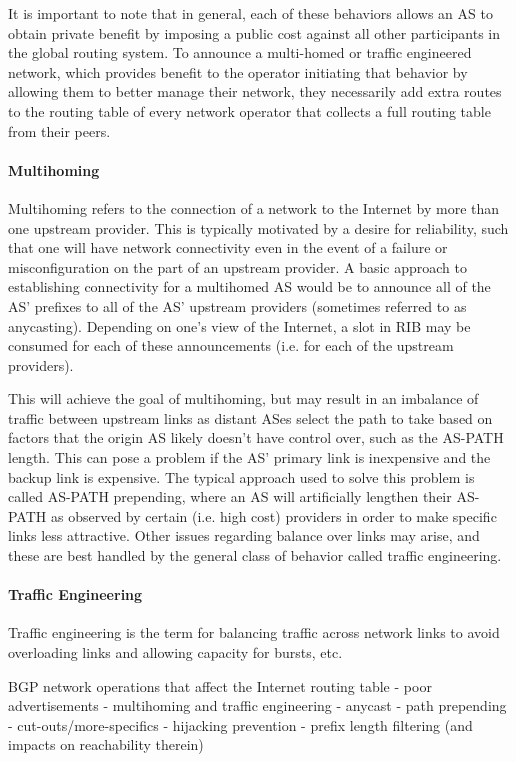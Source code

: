 It is important to note that in general, each of these behaviors allows an AS to obtain private benefit by imposing a public cost against all other participants in the global routing system. To announce a multi-homed or traffic engineered network, which provides benefit to the operator initiating that behavior by allowing them to better manage their network, they necessarily add extra routes to the routing table of every network operator that collects a full routing table from their peers.

\paragraph{Multihoming}

Multihoming refers to the connection of a network to the Internet by more than one upstream provider. This is typically motivated by a desire for reliability, such that one will have network connectivity even in the event of a failure or misconfiguration on the part of an upstream provider. A basic approach to establishing connectivity for a multihomed AS would be to announce all of the AS' prefixes to all of the AS' upstream providers (sometimes referred to as anycasting). Depending on one's view of the Internet, a slot in RIB may be consumed for each of these announcements (i.e. for each of the upstream providers).

This will achieve the goal of multihoming, but may result in an imbalance of traffic between upstream links as distant ASes select the path to take based on factors that the origin AS likely doesn't have control over, such as the AS-PATH length. This can pose a problem if the AS' primary link is inexpensive and the backup link is expensive. The typical approach used to solve this problem is called AS-PATH prepending, where an AS will artificially lengthen their AS-PATH as observed by certain (i.e. high cost) providers in order to make specific links less attractive. Other issues regarding balance over links may arise, and these are best handled by the general class of behavior called traffic engineering.

\paragraph{Traffic Engineering}

Traffic engineering is the term for balancing traffic across network links to avoid overloading links and allowing capacity for bursts, etc.

BGP network operations that affect the Internet routing table
       - poor advertisements
       - multihoming and traffic engineering
	- anycast
	- path prepending
	- cut-outs/more-specifics
       - hijacking prevention
       - prefix length filtering (and impacts on reachability therein)

